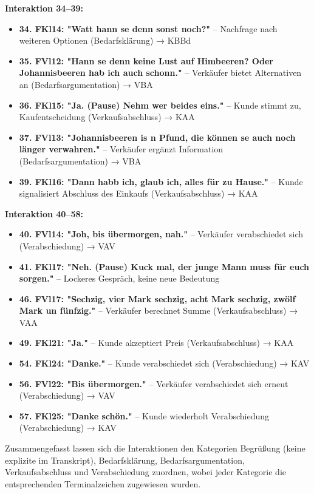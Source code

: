 \documentclass[
]{article}
\begin{document}
\textbf{Interaktion 34--39:}

\begin{itemize}
\item
  \textbf{34. FKl14: "Watt hann se denn sonst noch?"} -- Nachfrage nach
  weiteren Optionen (Bedarfsklärung) → KBBd
\item
  \textbf{35. FVl12: "Hann se denn keine Lust auf Himbeeren? Oder
  Johannisbeeren hab ich auch schonn."} -- Verkäufer bietet Alternativen
  an (Bedarfsargumentation) → VBA
\item
  \textbf{36. FKl15: "Ja. (Pause) Nehm wer beides eins."} -- Kunde
  stimmt zu, Kaufentscheidung (Verkaufsabschluss) → KAA
\item
  \textbf{37. FVl13: "Johannisbeeren is \textquotesingle n Pfund, die
  können se auch noch länger verwahren."} -- Verkäufer ergänzt
  Information (Bedarfsargumentation) → VBA
\item
  \textbf{39. FKl16: "Dann habb ich, glaub ich, alles für zu Hause."} --
  Kunde signalisiert Abschluss des Einkaufs (Verkaufsabschluss) → KAA
\end{itemize}

\textbf{Interaktion 40--58:}

\begin{itemize}
\item
  \textbf{40. FVl14: "Joh, bis übermorgen, nah."} -- Verkäufer
  verabschiedet sich (Verabschiedung) → VAV
\item
  \textbf{41. FKl17: "Neh. (Pause) Kuck mal, der junge Mann muss für
  euch sorgen."} -- Lockeres Gespräch, keine neue Bedeutung
\item
  \textbf{46. FVl17: "Sechzig, vier Mark sechzig, acht Mark sechzig,
  zwölf Mark un fünfzig."} -- Verkäufer berechnet Summe
  (Verkaufsabschluss) → VAA
\item
  \textbf{49. FKl21: "Ja."} -- Kunde akzeptiert Preis
  (Verkaufsabschluss) → KAA
\item
  \textbf{54. FKl24: "Danke."} -- Kunde verabschiedet sich
  (Verabschiedung) → KAV
\item
  \textbf{56. FVl22: "Bis übermorgen."} -- Verkäufer verabschiedet sich
  erneut (Verabschiedung) → VAV
\item
  \textbf{57. FKl25: "Danke schön."} -- Kunde wiederholt Verabschiedung
  (Verabschiedung) → KAV
\end{itemize}

Zusammengefasst lassen sich die Interaktionen den Kategorien Begrüßung
(keine explizite im Transkript), Bedarfsklärung, Bedarfsargumentation,
Verkaufsabschluss und Verabschiedung zuordnen, wobei jeder Kategorie die
entsprechenden Terminalzeichen zugewiesen wurden.
\end{document}
